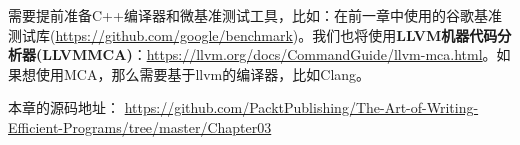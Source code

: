 需要提前准备C++编译器和微基准测试工具，比如：在前一章中使用的谷歌基准测试库(\url{https://github.com/google/benchmark})。我们也将使用\textbf{LLVM机器代码分析器(LLVMMCA)}：\url{https://llvm.org/docs/CommandGuide/llvm-mca.html}。如果想使用MCA，那么需要基于llvm的编译器，比如Clang。

本章的源码地址： \url{https://github.com/PacktPublishing/The-Art-of-Writing-Efficient-Programs/tree/master/Chapter03}